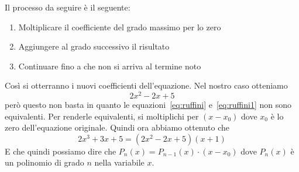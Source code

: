 Il processo da seguire è il seguente:
\begin{enumerate}
  \item Moltiplicare il coefficiente del grado massimo per lo zero
  \item Aggiungere al grado successivo il risultato
  \item Continuare fino a che non si arriva al termine noto
\end{enumerate}
Così si otterranno i nuovi coefficienti dell'equazione. Nel nostro caso otteniamo
\begin{equation}\label{eq:ruffini1}
  2x^2 -2x + 5
\end{equation}
però questo non basta in quanto le equazioni~\eqref{eq:ruffini} e~\eqref{eq:ruffini1} non sono 
equivalenti. Per renderle equivalenti, si moltiplichi per $(x-x_0)$ dove $x_0$ è lo zero dell'equazione
originale. Quindi ora abbiamo ottenuto che
\begin{equation*}
  2x^3 + 3x + 5 = (2x^2 -2x + 5)(x+1)
\end{equation*}
E che quindi possiamo dire che $P_n(x) = P_{n-1}(x)\cdot(x-x_0)$ dove $P_n(x)$ è un polinomio di grado
$n$ nella variabile $x$.

\setcounter{equation}{0}

